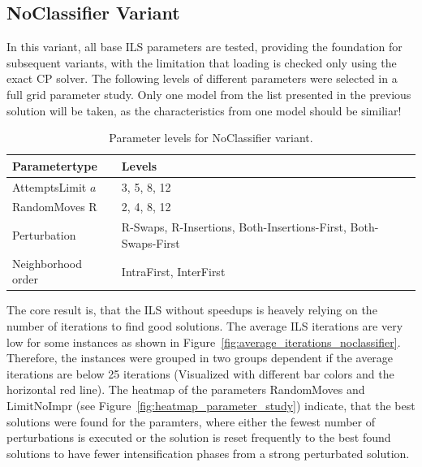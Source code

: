 \subsection{NoClassifier Variant}
\label{subsec_parameterStuy_noclassifier}
In this variant, all base \gls{ILS} parameters are tested, providing the foundation for subsequent variants,
with the limitation that loading is checked only using the exact \gls{CP} solver. The following levels of
different parameters were selected in a full grid parameter study. Only one model from the list presented
in the previous solution will be taken, as the characteristics from one model should be similiar!

\begin{table}[ht]
    \centering
    \setlength{\tabcolsep}{2em}
    \def\arraystretch{1.1}
    \begin{tabular}{@{}P{4cm}P{8cm}@{}}
        \toprule
        Parametertype      & Levels                                                         \\
        \midrule
        AttemptsLimit $a$  & 3, 5, 8, 12                                                    \\
        RandomMoves R      & 2, 4, 8, 12                                                    \\
        Perturbation       & R-Swaps, R-Insertions, Both-Insertions-First, Both-Swaps-First \\
        Neighborhood order & IntraFirst, InterFirst                                         \\
        \bottomrule
    \end{tabular}
    \caption{Parameter levels for NoClassifier variant.}
    \label{tab:parameters_noclassifier}
\end{table}

The core result is, that the \gls{ILS} without speedups is heavely relying on the number of iterations to find good
solutions. The average \gls{ILS} iterations are very low for some instances as shown in Figure~\ref{fig:average_iterations_noclassifier}.
Therefore, the instances were grouped in two groups dependent if the average iterations are below 25 iterations (Visualized with different bar
colors and the horizontal red line). The heatmap of the parameters RandomMoves and LimitNoImpr (see Figure~\ref{fig:heatmap_parameter_study}) indicate, that the best solutions
were found for the paramters, where either the fewest number of perturbations is executed or the solution is reset frequently to the best found
solutions to have fewer intensification phases from a strong perturbated solution.

